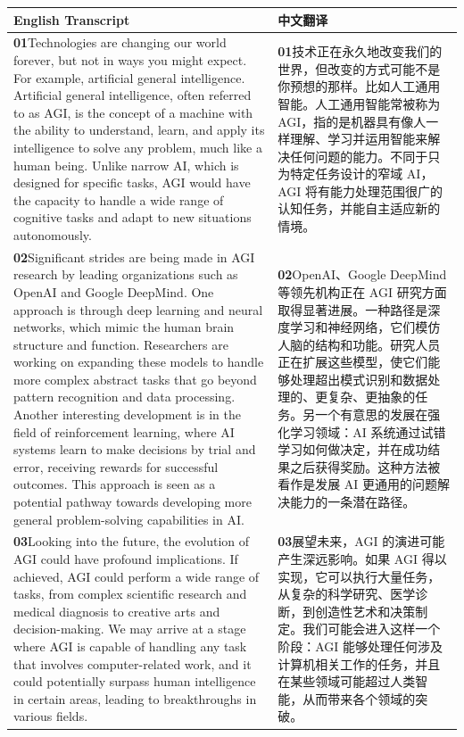 \documentclass[UTF8,zihao=-4,fontset=fandol]{ctexart}
\newcommand{\TranscriptColumn}{\raggedright\arraybackslash\hyphenpenalty=10000\exhyphenpenalty=10000\sloppy}
\begin{document}
\renewcommand{\arraystretch}{1.23}
\begin{longtable}{>{\TranscriptColumn}p{} >{\TranscriptColumn}p{}}
\rowcolor{headerBg}\textbf{English Transcript} & \textbf{中文翻译} \\ \hline
\textbf{01}\quad Technologies are changing our world forever, but not in ways you might expect. For example, artificial general intelligence. Artificial general intelligence, often referred to as AGI, is the concept of a machine with the ability to understand, learn, and apply its intelligence to solve any problem, much like a human being. Unlike narrow AI, which is designed for specific tasks, AGI would have the capacity to handle a wide range of cognitive tasks and adapt to new situations autonomously. & \textbf{01}\quad 技术正在永久地改变我们的世界，但改变的方式可能不是你预想的那样。比如人工通用智能。人工通用智能常被称为 AGI，指的是机器具有像人一样理解、学习并运用智能来解决任何问题的能力。不同于只为特定任务设计的窄域 AI，AGI 将有能力处理范围很广的认知任务，并能自主适应新的情境。 \\ \hline
\textbf{02}\quad Significant strides are being made in AGI research by leading organizations such as OpenAI and Google DeepMind. One approach is through deep learning and neural networks, which mimic the human brain structure and function. Researchers are working on expanding these models to handle more complex abstract tasks that go beyond pattern recognition and data processing. Another interesting development is in the field of reinforcement learning, where AI systems learn to make decisions by trial and error, receiving rewards for successful outcomes. This approach is seen as a potential pathway towards developing more general problem-solving capabilities in AI. & \textbf{02}\quad OpenAI、Google DeepMind 等领先机构正在 AGI 研究方面取得显著进展。一种路径是深度学习和神经网络，它们模仿人脑的结构和功能。研究人员正在扩展这些模型，使它们能够处理超出模式识别和数据处理的、更复杂、更抽象的任务。另一个有意思的发展在强化学习领域：AI 系统通过试错学习如何做决定，并在成功结果之后获得奖励。这种方法被看作是发展 AI 更通用的问题解决能力的一条潜在路径。 \\ \hline
\textbf{03}\quad Looking into the future, the evolution of AGI could have profound implications. If achieved, AGI could perform a wide range of tasks, from complex scientific research and medical diagnosis to creative arts and decision-making. We may arrive at a stage where AGI is capable of handling any task that involves computer-related work, and it could potentially surpass human intelligence in certain areas, leading to breakthroughs in various fields. & \textbf{03}\quad 展望未来，AGI 的演进可能产生深远影响。如果 AGI 得以实现，它可以执行大量任务，从复杂的科学研究、医学诊断，到创造性艺术和决策制定。我们可能会进入这样一个阶段：AGI 能够处理任何涉及计算机相关工作的任务，并且在某些领域可能超过人类智能，从而带来各个领域的突破。 \\ \hline

\end{longtable}
\end{document}
